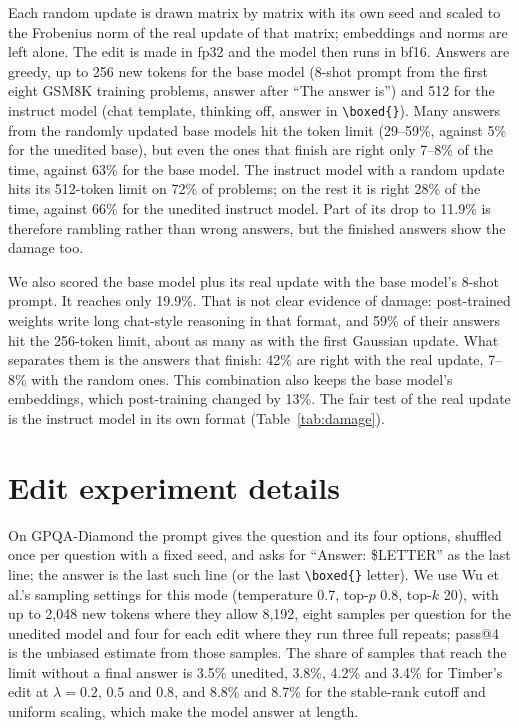 Each random update is drawn matrix by matrix with its own seed and scaled to
the Frobenius norm of the real update of that matrix; embeddings and norms are
left alone. The edit is made in fp32 and the model then runs in bf16. Answers
are greedy, up to 256 new tokens for the base model (8-shot prompt from the
first eight GSM8K training problems, answer after ``The answer is'') and 512
for the instruct model (chat template, thinking off, answer in
\verb|\boxed{}|). Many answers from the randomly updated base models hit the
token limit (29--59\%, against 5\% for the unedited base), but even the ones
that finish are right only 7--8\% of the time, against 63\% for the base model.
The instruct model with a random update hits its 512-token limit on 72\% of
problems; on the rest it is right 28\% of the time, against 66\% for the
unedited instruct model. Part of its drop to 11.9\% is therefore rambling
rather than wrong answers, but the finished answers show the damage too.

We also scored the base model plus its real update with the base model's
8-shot prompt. It reaches only 19.9\%. That is not clear evidence of damage:
post-trained weights write long chat-style reasoning in that format, and 59\%
of their answers hit the 256-token limit, about as many as with the first
Gaussian update. What separates them is the answers that finish: 42\% are
right with the real update, 7--8\% with the random ones. This combination also
keeps the base model's embeddings, which post-training changed by 13\%. The
fair test of the real update is the instruct model in its own format
(Table~\ref{tab:damage}).

\section{Edit experiment details}
\label{app:cutoff}

On GPQA-Diamond the prompt gives the question and its four options, shuffled
once per question with a fixed seed, and asks for ``Answer: \$LETTER'' as the
last line; the answer is the last such line (or the last \verb|\boxed{}|
letter). We use Wu et al.'s sampling settings for this mode (temperature 0.7,
top-$p$ 0.8, top-$k$ 20), with up to 2{,}048 new tokens where they allow
8{,}192, eight samples per question for the unedited model and four for each
edit where they run three full repeats; pass@4 is the unbiased estimate from
those samples. The share of samples that reach the limit without a final
answer is 3.5\% unedited, 3.8\%, 4.2\% and 3.4\% for Timber's edit at
$\lambda = 0.2$, $0.5$ and $0.8$, and 8.8\% and 8.7\% for the stable-rank
cutoff and uniform scaling, which make the model answer at length.

